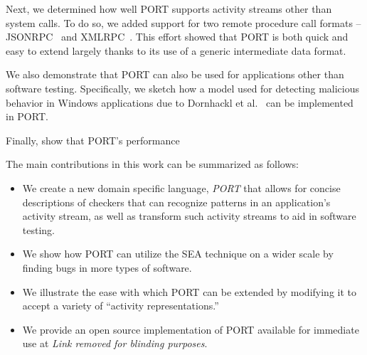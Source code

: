 Next, we
determined how well PORT
supports activity streams
other than system calls.
To do so, we 
added support for two remote procedure call formats --
JSONRPC~\cite{jsonspec} and XMLRPC~\cite{xmlspec}.
This effort
showed that PORT is both quick and easy to extend largely thanks to its
use of a generic intermediate data format.

We also demonstrate that PORT can also be used for applications other than software testing.
Specifically, we sketch how a model used for
detecting malicious behavior in Windows applications due to Dornhackl et al.~\cite{Dornhackl2014} can be implemented in PORT.

Finally, show that PORT's performance 


The main contributions in this work can be summarized as follows:

\begin{itemize}

\item We create a new domain specific language, {\em PORT}
  that allows for concise descriptions of checkers that can recognize patterns in
  an application's activity stream, as well as transform such activity streams to aid in software testing.

\item We show how PORT can utilize the SEA technique on a wider scale by finding bugs in more types of software.

\item We illustrate the ease with which PORT can be extended by modifying
  it to accept a variety of ``activity representations.''
  
\item We provide an open source implementation of PORT available for immediate use
at \textit{Link removed for blinding purposes}.

\end{itemize}


